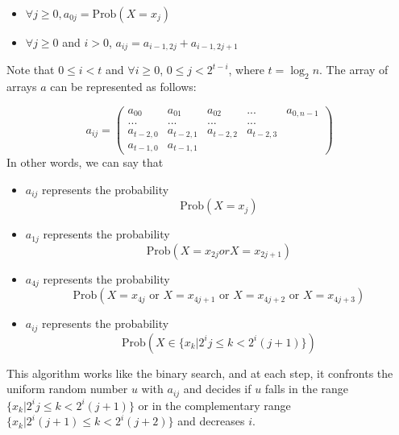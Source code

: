 \documentclass[justified, sixbynine]{tufte-book}
\theoremstyle{plain}%
\newtheorem * {corollary}{Corollary}
\theoremstyle{definition}
\theoremstyle{remark}
\newtheorem * {remark}{Remark}
\newtheorem * {note}{Note}
\begin{document}
\begin{fullwidth}
\begin{itemize}
\item  $\forall j\geq 0, a_{0j}=\textrm{Prob}(X=x_j)$

\item  $\forall j\geq 0$ and $i>0$, $a_{ij}=a_{i-1, 2j}+a_{i-1, 2j+1}$
\end{itemize}

Note that $0\leq i<t$ and $\forall i\geq 0$, $0\leq j<2^{t-i}$, where $t=\log
_2n$. The array of arrays $a$ can be represented as follows:

\begin{equation}
a_{ij}=\left(
\begin{array}{lllll}
a_{00} & a_{01} & a_{02} & ... & a_{0, n-1} \\
... & ... & ... & ... &  \\
a_{t-2, 0} & a_{t-2, 1} & a_{t-2, 2} & a_{t-2, 3} &  \\
a_{t-1, 0} & a_{t-1, 1} &  &  &
\end{array}
\right)
\end{equation}
In other words, we can say that

\begin{itemize}
\item  $a_{ij}$ represents the probability
\begin{equation}
\textrm{Prob}(X=x_j)
\end{equation}

\item  $a_{1j}$ represents the probability
\begin{equation}
\textrm{Prob}(X=x_{2j}orX=x_{2j+1})
\end{equation}

\item  $a_{4j}$ represents the probability
\begin{equation}
\textrm{Prob}(X=x_{4j}\text{ or }X=x_{4j+1}\text{ or }X=x_{4j+2}\text{ or }X=x_{4j+3})
\end{equation}

\item  $a_{ij}$ represents the probability
\begin{equation}
\textrm{Prob}(X\in \{x_k|2^ij\leq k<2^i(j+1)\})
\end{equation}
\end{itemize}

This algorithm works like the binary search, and at each step, it confronts the
uniform random number $u$ with $a_{ij}$ and decides if $u$ falls in the
range $\{x_k|2^ij\leq k<2^i(j+1)\}$ or in the complementary range $%
\{x_k|2^i(j+1)\leq k<2^i(j+2)\}$ and decreases $i.$


\end{fullwidth}
\end{document}
